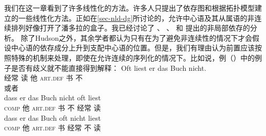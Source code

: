 我们在这一章看到了许多线性化的方法。许多人只提出了依存图和根据拓扑模型建立的一些线性化方法。正如在\ref{sec-nld-dg}所讨论的，允许中心语及其从属语的非连续排列好像打开了潘多拉的盒子。我已经讨论了 \citet{Kunze68a-u}、 \citet{Hudson97a,Hudson2000a}、 \citet*{KNR98a}和 \citet{GO2009a}提出的非局部依存的分析。
除了Hudson之外，其余学者都认为只有在为了避免非连续性的情况下才会假设中心语的依存成分上升到支配中心语的位置。但是，我们有理由认为前置应该按照特殊的机制来处理，即使在允许连续的序列化的情况下。比如说，例（）中的例子是否有歧义就不能直接得到解释：
\eal
\ex\label{ex-oft-liest-er-das-buch-nicht} 
\gll Oft liest er das Buch nicht.\\
     经常 读 他 \textsc{art}.\textsc{def}  书 不\\
\glt {} 或者\\
\ex
\gll dass er das Buch nicht oft liest\\
      \textsc{comp} 他 \textsc{art}.\textsc{def} 书 不 经常 读\\
\ex
\gll dass          er das          Buch oft nicht liest\\
     \textsc{comp} 他 \textsc{art}.\textsc{def} 书   经常  不    读\\
